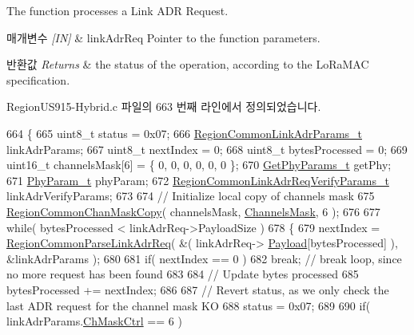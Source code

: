 The function processes a Link A\+DR Request. 


\begin{DoxyParams}{매개변수}
{\em \mbox{[}\+I\+N\mbox{]}} & link\+Adr\+Req Pointer to the function parameters.\\
\hline
\end{DoxyParams}

\begin{DoxyRetVals}{반환값}
{\em Returns} & the status of the operation, according to the Lo\+Ra\+M\+AC specification. \\
\hline
\end{DoxyRetVals}


Region\+U\+S915-\/\+Hybrid.\+c 파일의 663 번째 라인에서 정의되었습니다.


\begin{DoxyCode}
664 \{
665     uint8\_t status = 0x07;
666     \mbox{\hyperlink{structs_region_common_link_adr_params}{RegionCommonLinkAdrParams\_t}} linkAdrParams;
667     uint8\_t nextIndex = 0;
668     uint8\_t bytesProcessed = 0;
669     uint16\_t channelsMask[6] = \{ 0, 0, 0, 0, 0, 0 \};
670     \mbox{\hyperlink{structs_get_phy_params}{GetPhyParams\_t}} getPhy;
671     \mbox{\hyperlink{unionu_phy_param}{PhyParam\_t}} phyParam;
672     \mbox{\hyperlink{structs_region_common_link_adr_req_verify_params}{RegionCommonLinkAdrReqVerifyParams\_t}} linkAdrVerifyParams;
673 
674     \textcolor{comment}{// Initialize local copy of channels mask}
675     \mbox{\hyperlink{group___r_e_g_i_o_n_c_o_m_m_o_n_ga95f5199d490113269fae7f2e0569e9a0}{RegionCommonChanMaskCopy}}( channelsMask, \mbox{\hyperlink{_region_u_s915-_hybrid_8c_a2188957b5ca6af8092154d7ccbfa5757}{ChannelsMask}}, 6 );
676 
677     \textcolor{keywordflow}{while}( bytesProcessed < linkAdrReq->PayloadSize )
678     \{
679         nextIndex = \mbox{\hyperlink{group___r_e_g_i_o_n_c_o_m_m_o_n_ga8403c78482dbb901014dba48b75d78e8}{RegionCommonParseLinkAdrReq}}( &( linkAdrReq->
      \mbox{\hyperlink{structs_link_adr_req_params_a3dfbfe76c8f3bd25765750487b815147}{Payload}}[bytesProcessed] ), &linkAdrParams );
680 
681         \textcolor{keywordflow}{if}( nextIndex == 0 )
682             \textcolor{keywordflow}{break}; \textcolor{comment}{// break loop, since no more request has been found}
683 
684         \textcolor{comment}{// Update bytes processed}
685         bytesProcessed += nextIndex;
686 
687         \textcolor{comment}{// Revert status, as we only check the last ADR request for the channel mask KO}
688         status = 0x07;
689 
690         \textcolor{keywordflow}{if}( linkAdrParams.\mbox{\hyperlink{structs_region_common_link_adr_params_ac5e1891f30a172b2ce39bc3498e1843d}{ChMaskCtrl}} == 6 )

\end{DoxyCode}

